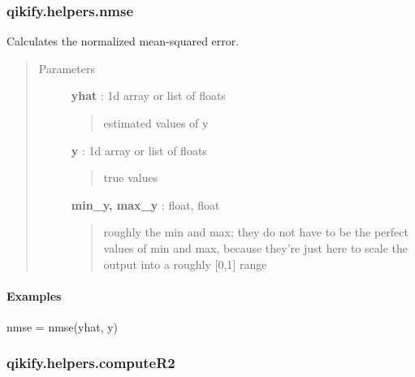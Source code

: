 \documentclass[letterpaper,10pt,english]{sphinxmanual}
\begin{document}
\subsubsection{qikify.helpers.nmse}
\label{generated/qikify.helpers.nmse::doc}\label{generated/qikify.helpers.nmse:qikify-helpers-nmse}

\begin{fulllineitems}
\label{generated/qikify.helpers.nmse:qikify.helpers.nmse}
Calculates the normalized mean-squared error.
\begin{quote}\begin{description}
\item[{Parameters }] \leavevmode
\textbf{yhat} : 1d array or list of floats
\begin{quote}

estimated values of y
\end{quote}

\textbf{y} : 1d array or list of floats
\begin{quote}

true values
\end{quote}

\textbf{min\_y, max\_y} : float, float
\begin{quote}

roughly the min and max; they do not have to be the perfect values of min and max, because
they're just here to scale the output into a roughly {[}0,1{]} range
\end{quote}

\end{description}\end{quote}
\paragraph{Examples}

nmse = nmse(yhat, y)

\end{fulllineitems}



\subsubsection{qikify.helpers.computeR2}
\label{generated/qikify.helpers.computeR2::doc}\label{generated/qikify.helpers.computeR2:qikify-helpers-computer2}
\end{document}
